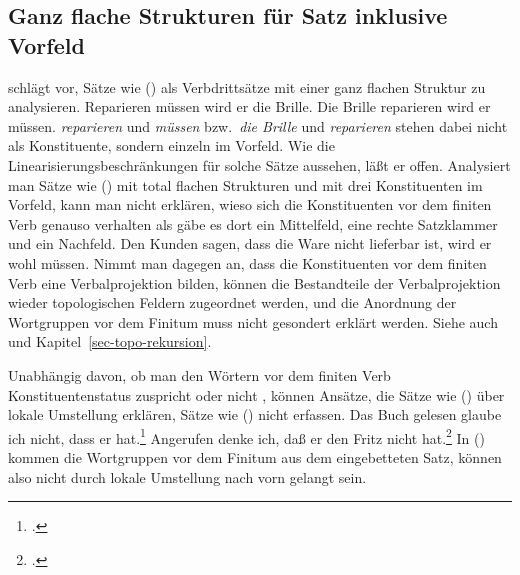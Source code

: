 


\subsection{Ganz flache Strukturen für Satz inklusive Vorfeld}
\label{sec-pvp-vdrei}

\citet[--171]{Gunkel2003b} schlägt vor, Sätze wie () als Verbdrittsätze
mit einer ganz flachen Struktur zu analysieren.
\eal
\ex Reparieren müssen wird er die Brille.
\ex Die Brille reparieren wird er müssen.
\zl 
\emph{reparieren} und \emph{müssen} bzw.\ \emph{die Brille} und \emph{reparieren}
stehen dabei nicht als Konstituente, sondern einzeln im Vorfeld.
Wie die Linearisierungsbeschränkungen
für solche Sätze aussehen, läßt er offen. Analysiert man Sätze wie () mit total
flachen Strukturen und mit drei Konstituenten im Vorfeld, kann man nicht erklären,
wieso sich die Konstituenten vor dem finiten Verb genauso verhalten als gäbe es dort
ein Mittelfeld, eine rechte Satzklammer und ein Nachfeld.
\ea
Den Kunden sagen, dass die Ware nicht lieferbar ist, wird er wohl müssen.
\z
Nimmt man dagegen an, dass die Konstituenten vor dem finiten Verb eine Verbalprojektion
bilden, können die Bestandteile der Verbalprojektion wieder topologischen Feldern
zugeordnet werden, und die Anordnung der Wortgruppen vor dem Finitum muss nicht gesondert
erklärt werden. Siehe auch  und Kapitel~\ref{sec-topo-rekursion}.

Unabhängig davon, ob man den Wörtern vor dem finiten Verb Konstituentenstatus
zuspricht \citep{Kathol95a} oder nicht \citep{Gunkel2003b}, können Ansätze,
die Sätze wie () über lokale Umstellung erklären, Sätze wie ()
nicht erfassen.
\eal
\ex Das Buch gelesen glaube ich nicht, dass er hat.\footnote{
  .
}
\ex Angerufen denke ich, daß er den Fritz nicht hat.\footnote{
  .
}
\zl
In () kommen die Wortgruppen vor dem Finitum aus dem eingebetteten Satz,
können also nicht durch lokale Umstellung nach vorn gelangt sein.

